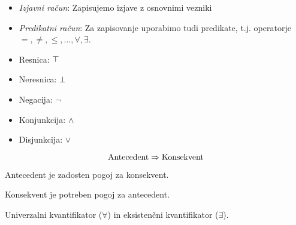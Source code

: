 \begin{itemize}
	\item \textit{Izjavni račun}: Zapisujemo izjave z osnovnimi vezniki
	\item \textit{Predikatni račun}: Za zapisovanje uporabimo tudi predikate, t.j. operatorje $=, \ne, \le, \ldots, \forall, \exists$.
\end{itemize}


\begin{itemize}
	\item Resnica: $\top$
	\item Neresnica: $\bot$
	\item Negacija: $\neg$
	\item Konjunkcija: $\land$
	\item Disjunkcija: $\lor$
\end{itemize}


\[
	\text{Antecedent} \Rightarrow \text{Konsekvent}
\]

Antecedent je zadosten pogoj za konsekvent.

Konsekvent je potreben pogoj za antecedent.


Univerzalni kvantifikator ($\forall$) in eksistenčni kvantifikator ($\exists$).